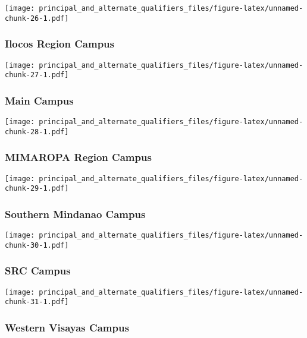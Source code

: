\documentclass[]{article}
\begin{document}
\texttt{[image: principal\_and\_alternate\_qualifiers\_files/figure-latex/unnamed-chunk-26-1.pdf]}

\hypertarget{ilocos-region-campus}{%
\subsubsection{Ilocos Region Campus}\label{ilocos-region-campus}}

\texttt{[image: principal\_and\_alternate\_qualifiers\_files/figure-latex/unnamed-chunk-27-1.pdf]}

\hypertarget{main-campus}{%
\subsubsection{Main Campus}\label{main-campus}}

\texttt{[image: principal\_and\_alternate\_qualifiers\_files/figure-latex/unnamed-chunk-28-1.pdf]}

\hypertarget{mimaropa-region-campus}{%
\subsubsection{MIMAROPA Region Campus}\label{mimaropa-region-campus}}

\texttt{[image: principal\_and\_alternate\_qualifiers\_files/figure-latex/unnamed-chunk-29-1.pdf]}

\hypertarget{southern-mindanao-campus}{%
\subsubsection{Southern Mindanao
Campus}\label{southern-mindanao-campus}}

\texttt{[image: principal\_and\_alternate\_qualifiers\_files/figure-latex/unnamed-chunk-30-1.pdf]}

\hypertarget{src-campus}{%
\subsubsection{SRC Campus}\label{src-campus}}

\texttt{[image: principal\_and\_alternate\_qualifiers\_files/figure-latex/unnamed-chunk-31-1.pdf]}

\hypertarget{western-visayas-campus}{%
\subsubsection{Western Visayas Campus}\label{western-visayas-campus}}
\end{document}

